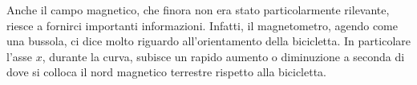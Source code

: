 \documentclass[12pt]{article}
\begin{document}
	Anche il campo magnetico, che finora non era stato particolarmente rilevante, riesce a fornirci importanti informazioni. Infatti, il magnetometro, agendo come una bussola, ci dice molto riguardo all'orientamento della bicicletta. In particolare l'asse \(x\), durante la curva, subisce un rapido aumento o diminuzione a seconda di dove si colloca il nord magnetico terrestre rispetto alla bicicletta.
	
		
\end{document}
